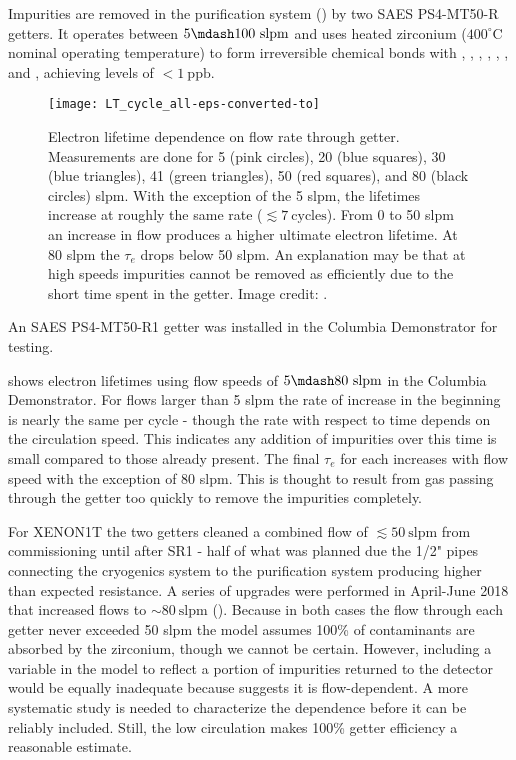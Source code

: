 Impurities are removed in the purification system () by two SAES PS4-MT50-R getters.  It operates between
$5 \mdash 100\ \mathrm{slpm}$ and uses heated zirconium ($400^{\circ}\mathrm{C}$ nominal operating temperature) to form irreversible
chemical bonds with , , , , , , and , achieving levels of
$< 1\ \mathrm{ppb}$.

\begin{figure}
\centering
\texttt{[image: LT\_cycle\_all-eps-converted-to]}
\caption{Electron lifetime dependence on flow rate through getter.  Measurements are done for 5 (pink circles), 20 (blue squares), 30
(blue
triangles), 41 (green triangles), 50 (red squares), and 80 (black circles) slpm.  With the exception of the 5 slpm, the lifetimes increase
at roughly the same rate ($\lesssim 7\ \mathrm{cycles}$).  From 0 to 50 slpm an increase in flow produces a higher ultimate electron
lifetime.  At 80 slpm the $\tau_e$ drops below 50 slpm.  An explanation may be that at high speeds impurities cannot be removed as
efficiently due to the short time spent in the getter.  Image credit: .}
\label{fig:electron_lifetime_model_removal_demonstrator_circ}
\end{figure}

An SAES PS4-MT50-R1 getter was installed in the Columbia Demonstrator for testing.

 shows electron lifetimes using flow speeds of $5 \mdash 80\ \mathrm{slpm}$
in the Columbia Demonstrator.  For flows larger than 5 slpm the rate of increase in the beginning is nearly the same per cycle - though
the rate with respect to time depends on the circulation speed.  This indicates any addition of impurities over this time is small
compared to those already present.  The final $\tau_e$ for each increases with flow speed with the exception of 80 slpm.  This is thought
to result from gas passing through the getter too quickly to remove the impurities completely.

For XENON1T the two getters cleaned a combined flow of $\lesssim 50\ \mathrm{slpm}$ from commissioning until after SR1 - half of what was
planned due the 1/2" pipes connecting the cryogenics system to the purification system producing higher than expected resistance.  A
series of
upgrades were performed in April-June 2018 that increased flows to ${\sim} 80\ \mathrm{slpm}$
().  Because in both cases the
flow through each getter never exceeded 50 slpm the model assumes 100\% of contaminants are absorbed by the zirconium, though we cannot
be certain.  However, including a variable in the model to reflect a portion of impurities returned
to the detector would be equally inadequate because  suggests it is
flow-dependent.  A more systematic study is needed to characterize the dependence before it can be reliably included.  Still, the low
circulation makes 100\% getter efficiency a reasonable estimate.

